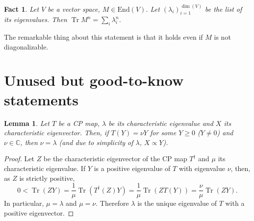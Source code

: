 \documentclass{article}
\newtheorem{lemma}{Lemma}
\newtheorem{fact}{Fact}
\newcommand{\tr}{\operatorname{Tr}}
\newcommand{\End}{\mathrm{End}}
\begin{document}
\begin{fact}\label{fact:trace_eigen}
  Let $V$ be a vector space, $M\in \End(V)$. Let $(\lambda_i)_{i=1}^{\dim(V)}$ be the list of its eigenvalues. Then $\tr M^n = \sum_i \lambda_i^n$.
\end{fact}

The remarkable thing about this statement is that it holds even if $M$ is not diagonalizable. 


\section{Unused but good-to-know statements}

\begin{lemma}
  Let $T$ be a CP map, $\lambda$ be its characteristic eigenvalue and $X$ its characteristic eigenvector. Then, if $T(Y) = \nu Y$ for some $Y\geq 0$ ($Y\neq 0$) and $\nu\in \mathbb{C}$, then $\nu = \lambda$ (and due to simplicity of $\lambda$, $X\propto Y$).
\end{lemma}

\begin{proof}
   Let $Z$ be the characteristic eigenvector of  the CP map $T^\dagger$ and $\mu$ its characteristic eigenvalue. If $Y$ is a positive eigenvalue of $T$ with eigenvalue $\nu$, then, as $Z$ is strictly positive,
  \begin{equation*}
    0< \tr(ZY) = \frac{1}{\mu} \tr(T^\dagger(Z)Y) = \frac{1}{\mu} \tr(Z T(Y)) = \frac{\nu}{\mu} \tr(ZY).
  \end{equation*}
  In particular, $\mu = \lambda$ and $\mu=\nu$. Therefore $\lambda$ is the unique eigenvalue of $T$ with a positive eigenvector.
\end{proof}
\end{document}
